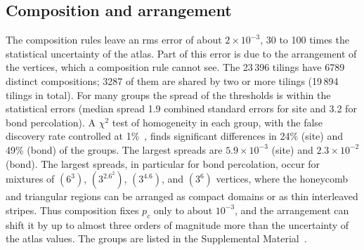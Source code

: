 \documentclass[pre,twocolumn,superscriptaddress,longbibliography,floatfix]{revtex4-2}
\newcommand{\pc}{p_c}
\begin{document}
\subsection{Composition and arrangement}

The composition rules leave an rms error of about $2\times10^{-3}$, 30 to 100 times the statistical uncertainty of the atlas. Part of this error is due to the arrangement of the vertices, which a composition rule cannot see. The 23\,396 tilings have 6789 distinct compositions; 3287 of them are shared by two or more tilings (19\,894 tilings in total). For many groups the spread of the thresholds is within the statistical errors (median spread 1.9 combined standard errors for site and 3.2 for bond percolation). A $\chi^2$ test of homogeneity in each group, with the false discovery rate controlled at 1\%~\cite{BenjaminiHochberg95}, finds significant differences in 24\% (site) and 49\% (bond) of the groups. The largest spreads are $5.9\times10^{-3}$ (site) and $2.3\times10^{-2}$ (bond). The largest spreads, in particular for bond percolation, occur for mixtures of $(6^3)$, $(3^2.6^2)$, $(3^4.6)$, and $(3^6)$ vertices, where the honeycomb and triangular regions can be arranged as compact domains or as thin interleaved stripes. Thus composition fixes $\pc$ only to about $10^{-3}$, and the arrangement can shift it by up to almost three orders of magnitude more than the uncertainty of the atlas values. The groups are listed in the Supplemental Material~\cite{SM}.
\end{document}

